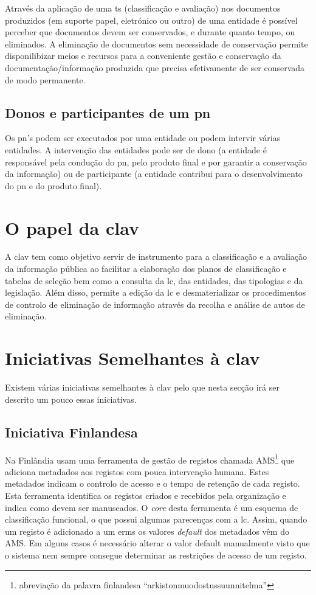 Através da aplicação de uma \acrshort{ts} (classificação e avaliação) nos documentos produzidos (em suporte papel, eletrónico ou outro) de uma entidade é possível perceber que documentos devem ser conservados, e durante quanto tempo, ou eliminados. A eliminação de documentos sem necessidade de conservação permite disponilibizar meios e recursos para a conveniente gestão e conservação da documentação/informação produzida que precisa efetivamente de ser conservada de modo permanente.~\cite{ts}

\subsection{Donos e participantes de um \acrlong{pn}}

Os \acrshort{pn}'s podem ser executados por uma entidade ou podem intervir várias entidades. A intervenção das entidades pode ser de dono (a entidade é responsável pela condução do \acrshort{pn}, pelo produto final e por garantir a conservação da informação) ou de participante (a entidade contribui para o desenvolvimento do \acrshort{pn} e do produto final).

\section{O papel da \acrshort{clav}}

A \acrshort{clav} tem como objetivo servir de instrumento para a classificação e a avaliação da informação pública ao facilitar a elaboração dos planos de classificação e tabelas de seleção bem como a consulta da \acrshort{lc}, das entidades, das tipologias e da legislação. Além disso, permite a edição da \acrshort{lc} e desmaterializar os procedimentos de controlo de eliminação de informação através da recolha e análise de autos de eliminação.

\section{Iniciativas Semelhantes à \acrshort{clav}}

Existem várias iniciativas semelhantes à \acrshort{clav} pelo que nesta secção irá ser descrito um pouco essas iniciativas.

\subsection{Iniciativa Finlandesa}
Na Finlândia usam uma ferramenta de gestão de registos chamada AMS\footnote{abreviação da palavra finlandesa ``arkistonmuodostussuunnitelma''} que adiciona metadados aos registos com pouca intervenção humana. Estes metadados indicam o controlo de acesso e o tempo de retenção de cada registo. Esta ferramenta identifica os registos criados e recebidos pela organização e indica como devem ser manuseados. O \textit{core} desta ferramenta é um esquema de classificação funcional, o que possui algumas parecenças com a \acrshort{lc}. Assim, quando um registo é adicionado a um \acrfull{erms} os valores \textit{default} dos metadados vêm do AMS. Em alguns casos é necessário alterar o valor default manualmente visto que o sistema nem sempre consegue determinar as restrições de acesso de um registo.


